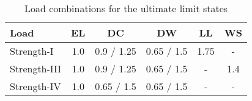 \begin{table}[H]
\caption{Load combinations for the ultimate limit states}
\label{tab:uls_combination}
\centering
\begin{tabular}{lccccc}
\hline
Load         & EL  & DC         & DW         & LL   & WS  \\ \hline
Strength-I   & 1.0 & 0.9 / 1.25 & 0.65 / 1.5 & 1.75 & -   \\
Strength-III & 1.0 & 0.9 / 1.25 & 0.65 / 1.5 & -    & 1.4 \\ 
Strength-IV  & 1.0 & 0.65 / 1.5 & 0.65 / 1.5 & -    & - \\ \hline
\end{tabular}
\end{table}
